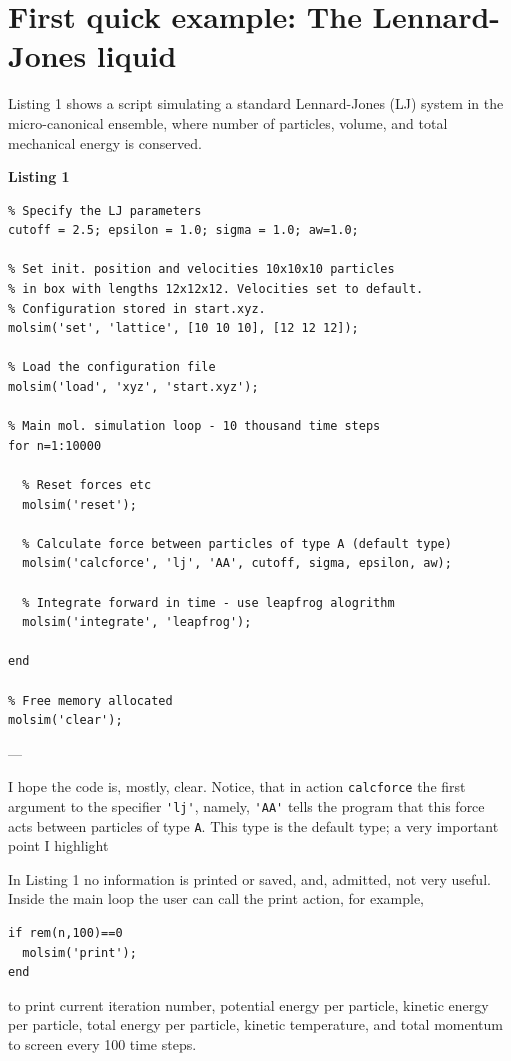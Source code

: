 \documentclass[11pt]{article}
\begin{document}
\section{First quick example: The Lennard-Jones liquid}
Listing 1 shows a script simulating a standard Lennard-Jones (LJ) system in the
micro-canonical ensemble, where number of particles, volume, and total
mechanical energy is conserved.

\bigskip

\noindent \textbf{Listing 1}
\begin{verbatim}
% Specify the LJ parameters
cutoff = 2.5; epsilon = 1.0; sigma = 1.0; aw=1.0;

% Set init. position and velocities 10x10x10 particles 
% in box with lengths 12x12x12. Velocities set to default. 
% Configuration stored in start.xyz. 
molsim('set', 'lattice', [10 10 10], [12 12 12]);

% Load the configuration file
molsim('load', 'xyz', 'start.xyz');

% Main mol. simulation loop - 10 thousand time steps
for n=1:10000

  % Reset forces etc
  molsim('reset');

  % Calculate force between particles of type A (default type)
  molsim('calcforce', 'lj', 'AA', cutoff, sigma, epsilon, aw);

  % Integrate forward in time - use leapfrog alogrithm
  molsim('integrate', 'leapfrog');
 
end

% Free memory allocated
molsim('clear');
\end{verbatim}
---

\bigskip

\noindent I hope the code is, mostly, clear. Notice, that in action \verb!calcforce! the 
first argument to the specifier \verb!'lj'!, namely, \verb!'AA'! tells the program that this 
force acts between particles of type \verb!A!. This type is the default type;
a very important point I highlight
\begin{center}
\end{center}


\noindent In Listing 1 no information is printed or saved, and, admitted, not very
useful. Inside the main loop the user can call the \textsf{print} action, for
example, 
\begin{verbatim}
if rem(n,100)==0
  molsim('print');
end
\end{verbatim}
to print current iteration number, potential energy per particle, kinetic energy
per particle, total energy per particle, kinetic temperature, and total momentum
to screen every 100 time steps.
\end{document}
